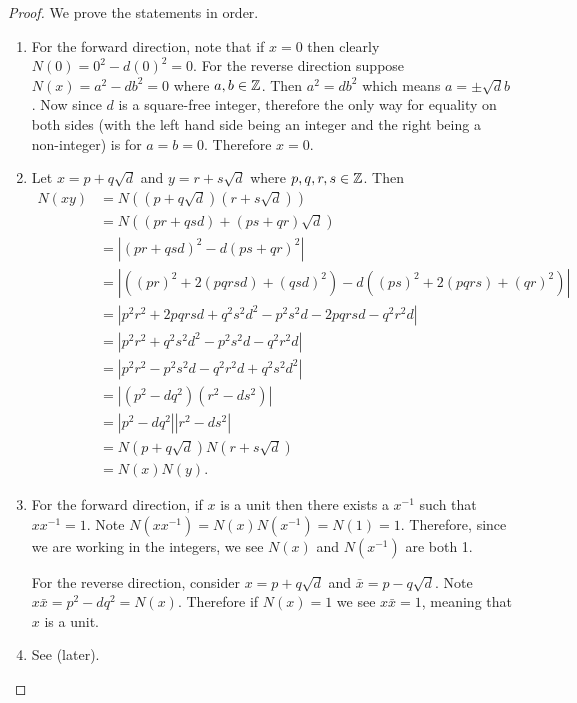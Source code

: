 \begin{proof}
    We prove the statements in order.
    \begin{enumerate}
        \item For the forward direction, note that if $x = 0$ then clearly $N(0) = 0^2 - d(0)^2 = 0$. For the reverse direction suppose $N(x) = a^2 - db^2 = 0$ where $a,b \in \mathbb{Z}$. Then $a^2 = db^2$ which means $a = \pm\sqrt{d}b$. Now since $d$ is a square-free integer, therefore the only way for equality on both sides (with the left hand side being an integer and the right being a non-integer) is for $a = b = 0$. Therefore $x = 0$.

        \item Let $x = p + q\sqrt{d}$ and $y = r + s\sqrt{d}$ where $p,q,r,s \in \mathbb{Z}$. Then
        \begin{align*}
            N(xy) &= N\left((p+q\sqrt{d})(r+s\sqrt{d})\right)\\
            &= N\left((pr + qsd) + (ps + qr)\sqrt{d}\right)\\
            &= \left|(pr+qsd)^2 - d(ps+qr)^2\right|\\
            &= \left|\left((pr)^2 + 2(pqrsd) + (qsd)^2\right) - d\left((ps)^2 + 2(pqrs) + (qr)^2\right)\right|\\
            &= \left|p^2r^2 + 2pqrsd + q^2s^2d^2 - p^2s^2d - 2pqrsd - q^2r^2d\right|\\
            &= \left|p^2r^2 + q^2s^2d^2 - p^2s^2d - q^2r^2d\right|\\
            &= \left|p^2r^2 - p^2s^2d - q^2r^2d + q^2s^2d^2\right|\\
            &= \left|(p^2 - dq^2)(r^2 - ds^2)\right|\\
            &= \left|p^2 - dq^2\right|\left|r^2 - ds^2\right|\\
            &= N(p+q\sqrt{d})N(r+s\sqrt{d})\\
            &= N(x)N(y).
        \end{align*}

        \item For the forward direction, if $x$ is a unit then there exists a $x^{-1}$ such that $xx^{-1} = 1$. Note $N(xx^{-1}) = N(x)N(x^{-1}) = N(1) = 1$. Therefore, since we are working in the integers, we see $N(x)$ and $N(x^{-1})$ are both 1.

        For the reverse direction, consider $x = p+q\sqrt{d}$ and $\bar{x} = p-q\sqrt{d}$. Note $x\bar{x} = p^2-dq^2 = N(x)$. Therefore if $N(x) = 1$ we see $x\bar{x} = 1$, meaning that $x$ is a unit.

        \item See  (later). \qedhere
    \end{enumerate}
\end{proof}


